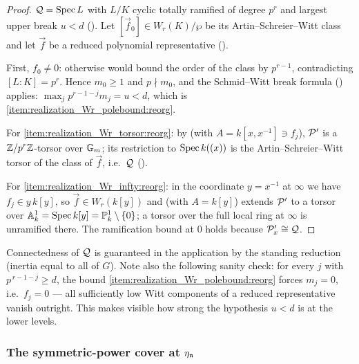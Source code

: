 \begin{proof}
    $\mathcal{Q} = \operatorname{Spec} L$ with $L/K$ cyclic totally ramified of degree $p^r$ and largest
    upper break $u < d$ (). Let
    $[\vec f_0] \in W_r(K)/\wp$ be its Artin--Schreier--Witt class and let $\vec f$ be
    a reduced polynomial representative
    ().

    First, $f_0 \neq 0$: otherwise
     would bound the order of the class
    by $p^{r-1}$, contradicting $[L:K] = p^r$. Hence $m_0 \geq 1$ and $p \nmid m_0$,
    and the Schmid--Witt break formula
    () applies:
    $\max_j p^{r-1-j} m_j = u < d$, which is \ref{item:realization_Wr_polebound:reorg}.

    For \ref{item:realization_Wr_torsor:reorg}: by  (with
    $A = k[x,x^{-1}] \ni f_j$), $\mathcal{P}'$ is a $\mathbb{Z}/p^r\mathbb{Z}$-torsor over $\mathbb{G}_m$; its
    restriction to $\operatorname{Spec} k((x))$ is the Artin--Schreier--Witt torsor of the class of
    $\vec f$, i.e.\ $\mathcal{Q}$ ().

    For \ref{item:realization_Wr_infty:reorg}: in the coordinate $y = x^{-1}$ at $\infty$ we
    have $f_j \in y\,k[y]$, so $\vec f \in W_r(k[y])$ and
     (with $A = k[y]$) extends $\mathcal{P}'$ to a torsor over
    $\mathbb{A}^1_k = \operatorname{Spec} k[y] = \mathbb{P}^1_k \setminus \{0\}$; a torsor over the full local ring
    at $\infty$ is unramified there. The ramification bound at $0$ holds because
    $\mathcal{P}'_x \cong \mathcal{Q}$.
\end{proof}

\begin{rem*}\label{rem:realization_Wr_sanity:reorg}
    Connectedness of $\mathcal{Q}$ is guaranteed in the application by the standing reduction
    (inertia equal to all of $G$). Note also the following sanity check: for every
    $j$ with $p^{\,r-1-j} \geq d$, the bound \ref{item:realization_Wr_polebound:reorg}
    forces $m_j = 0$, i.e.\ $f_j = 0$ --- all sufficiently low Witt components of a
    reduced representative vanish outright. This makes visible how strong the
    hypothesis $u < d$ is at the lower levels.
\end{rem*}

\subsubsection*{The symmetric-power cover at $\eta_{\mathfrak{n}}$}

